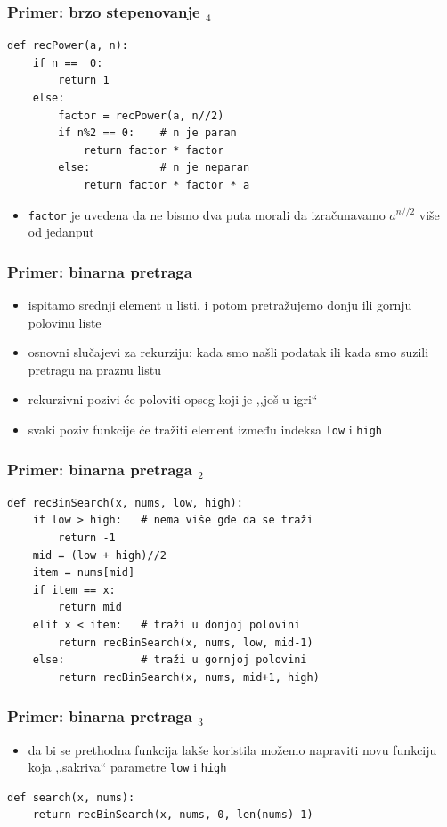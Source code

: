 \documentclass[utf8,compress]{beamer}
\begin{document}
\begin{frame}[fragile]
  \frametitle{Primer: brzo stepenovanje $_4$}
\begin{verbatim}
def recPower(a, n):
    if n ==  0:
        return 1
    else:
        factor = recPower(a, n//2)
        if n%2 == 0:    # n je paran
            return factor * factor
        else:           # n je neparan
            return factor * factor * a
\end{verbatim}
  \begin{itemize}
    \item {} \texttt{factor} je uvedena da ne bismo dva puta morali da izračunavamo $a^{n//2}$ više od jedanput
  \end{itemize}
\end{frame}

\begin{frame}[fragile]
  \frametitle{Primer: binarna pretraga}
  \begin{itemize}
    \item ispitamo srednji element u listi, i potom pretražujemo donju ili gornju polovinu liste
    \item osnovni slučajevi za rekurziju: kada smo našli podatak ili kada smo suzili pretragu na praznu listu
    \item rekurzivni pozivi će poloviti opseg koji je ,,još u igri``
    \item svaki poziv funkcije će tražiti element između indeksa \texttt{low} i \texttt{high}
  \end{itemize}
\end{frame}

\begin{frame}[fragile]
  \frametitle{Primer: binarna pretraga $_2$}
\begin{verbatim}
def recBinSearch(x, nums, low, high):
    if low > high:   # nema više gde da se traži
        return -1
    mid = (low + high)//2
    item = nums[mid]
    if item == x:
        return mid
    elif x < item:   # traži u donjoj polovini
        return recBinSearch(x, nums, low, mid-1)
    else:            # traži u gornjoj polovini
        return recBinSearch(x, nums, mid+1, high)
\end{verbatim}
\end{frame}

\begin{frame}[fragile]
  \frametitle{Primer: binarna pretraga $_3$}
  \begin{itemize}
    \item da bi se prethodna funkcija lakše koristila možemo napraviti novu funkciju koja ,,sakriva`` parametre \texttt{low} i \texttt{high}
  \end{itemize}
\begin{verbatim}
def search(x, nums):
    return recBinSearch(x, nums, 0, len(nums)-1)
\end{verbatim}
\end{frame}
\end{document}
